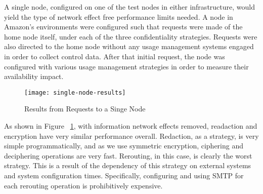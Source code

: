 A single node, configured on one of the test nodes in either infrastructure, would yield the type of network effect free performance limits needed.  A node in Amazon's environments were configured such that requests were made of the home node itself, under each of the three confidentiality strategies.  Requests were also directed to the home node without any usage management systems engaged in order to collect control data.  After that initial request, the node was configured with various usage management strategies in order to measure their availability impact.

\begin{figure}[!t]
\centering
\texttt{[image: single-node-results]}
\caption{Results from Requests to a Singe Node}
\label{fig:model:single-node-results}
\end{figure}

As shown in Figure ~\ref{fig:model:single-node-results}, with information network effects removed, readaction and encryption have very similar performance overall.  Redaction, as a strategy, is very simple programmatically, and as we use symmetric encryption, ciphering and deciphering operations are very fast.  Rerouting, in this case, is clearly the worst strategy.  This is a result of the dependency of this strategy on external systems and system configuration times.  Specifically, configuring and using SMTP for each rerouting operation is prohibitively expensive.